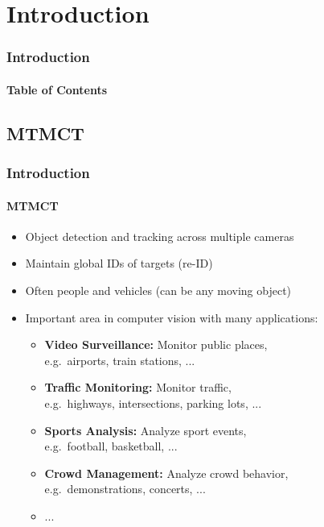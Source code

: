 \section{Introduction}
\begin{frame}
      \frametitle{Introduction}
      \framesubtitle{Table of Contents}
      {
            \hypersetup{hidelinks}
      }
\end{frame}

\subsection{MTMCT}
\begin{frame}
      \frametitle{Introduction}
      \framesubtitle{MTMCT}

      \begin{itemize}
            \item <1-> Object detection and tracking across multiple cameras
                  \vspace{5pt}
            \item <2-> Maintain global IDs of targets (re-ID)
                  \vspace{5pt}
            \item <3-> Often people and vehicles (can be any moving object)
                  \vspace{5pt}
            \item <4-> Important area in computer vision with many applications:
                  \begin{itemize}
                        \item <4-> \textbf{Video Surveillance:} Monitor public places,\\e.g.~airports, train stations, ...
                        \item <5-> \textbf{Traffic Monitoring:} Monitor traffic,\\e.g.~highways, intersections, parking lots, ...
                        \item <6-> \textbf{Sports Analysis:} Analyze sport events,\\e.g.~football, basketball, ...
                        \item <7-> \textbf{Crowd Management:} Analyze crowd behavior,\\e.g.~demonstrations, concerts, ...
                        \item <7-> ...
                  \end{itemize}
      \end{itemize}
\end{frame}

